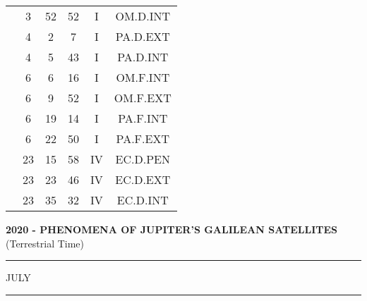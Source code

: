\documentclass[12pt, a4paper]{article}
\begin{document}
\begin{multicols}{3}
{\begin{tabular}{c c c c c c}
	 	 	 	 & 3 & 52 & 52 & I & OM.D.INT\\%
	 	 	 	 & 4 & 2 & 7 & I & PA.D.EXT\\%
	 	 	 	 & 4 & 5 & 43 & I & PA.D.INT\\%
	 	 	 	 & 6 & 6 & 16 & I & OM.F.INT\\%
	 	 	 	 & 6 & 9 & 52 & I & OM.F.EXT\\%
	 	 	 	 & 6 & 19 & 14 & I & PA.F.INT\\%
	 	 	 	 & 6 & 22 & 50 & I & PA.F.EXT\\%
	 	 	 	 & 23 & 15 & 58 & IV & EC.D.PEN\\%
	 	 	 	 & 23 & 23 & 46 & IV & EC.D.EXT\\%
	 	 	 	 & 23 & 35 & 32 & IV & EC.D.INT\\%
	 	 \end{tabular}
 	}
\end{multicols}
\textbf{2020 - PHENOMENA OF JUPITER'S GALILEAN SATELLITES}\\(Terrestrial Time) 
\vspace{0.1cm} \hrule \vspace{0.1cm}
JULY\vspace{0.1cm}
\hrule
\vspace{-0.2cm}
\end{document}
